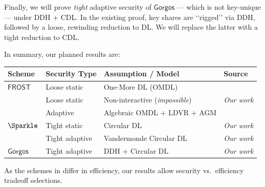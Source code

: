  Finally, we will  prove \emph{tight}  adaptive security of $\mathsf{Gorgos}$ --- which is not key-unique  --- under DDH + CDL. In the existing  proof, key shares are ‘`rigged'’ via DDH, followed by a loose, rewinding reduction to DL. We will replace the latter with a tight reduction to  CDL. %

 
 
In summary, our planned results are:

\begin{table}[H]
\centering
\renewcommand{\arraystretch}{1.2}
\begin{tabular}{|l|l|l|l|}
\hline
\textbf{Scheme} & \textbf{Security Type} & \textbf{Assumption / Model} & \textbf{Source} \\ \hline
$\mathsf{FROST}$ & Loose static & One-More DL (OMDL) & \cite{C:BCKMTZ22} \\
                 & Loose static & Non-interactive (\emph{impossible}) & \emph{Our work} \\
                 & Adaptive & Algebraic OMDL + LDVR + AGM & \cite{C:KKTZ25} \\ \hline
$\Sparkle$       & Tight static & Circular DL & \emph{Our work} \\
                 & Tight adaptive & Vandermonde Circular DL & \emph{Our work} \\ \hline
$\mathsf{Gorgos}$ & Tight adaptive & DDH + Circular DL & \emph{Our work} \\ \hline
\end{tabular}
\end{table}
\noindent As the schemes in differ in efficiency, our results allow security vs.~efficiency tradeoff selections.

